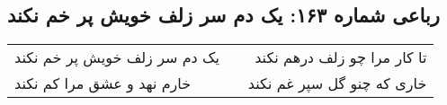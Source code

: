 \begin{center}
\section*{رباعی شماره ۱۶۳: یک دم سر زلف خویش پر خم نکند}
\label{sec:sh163}
\begin{longtable}{l p{0.5cm} r}
یک دم سر زلف خویش پر خم نکند
&&
تا کار مرا چو زلف درهم نکند
\\
خارم نهد و عشق مرا کم نکند
&&
خاری که چنو گل سپر غم نکند
\\
\end{longtable}
\end{center}
